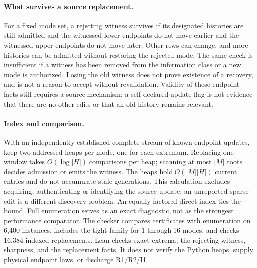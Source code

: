 \documentclass[11pt]{article}
\begin{document}
\paragraph{What survives a source replacement.}
For a fixed mode set, a rejecting witness survives if its designated
histories are still admitted and the witnessed lower endpoints
do not move earlier and the witnessed upper endpoints do not move
later. Other rows can change, and more histories can be admitted
without restoring the rejected mode. The same check is insufficient
if a witness has been removed from the information class or a new
mode is authorized. Losing the old witness does not prove existence
of a recovery, and is not a reason to accept without revalidation.
Validity of these endpoint facts still requires a source mechanism;
a self-declared update flag is not evidence that there are no
other edits or that an old history remains relevant.

\paragraph{Index and comparison.}
With an independently established complete stream of known endpoint
updates, keep two addressed heaps per mode, one for each extremum.
Replacing one window takes \(O(\log|H|)\) comparisons per heap;
scanning at most \(|M|\) roots decides admission or emits the witness.
The heaps hold \(O(|M||H|)\) current entries and do not accumulate
stale generations. This calculation excludes acquiring, authenticating
or identifying the source update; an unreported sparse edit is a
different discovery problem. An equally factored direct index ties
the bound. Full enumeration serves as an exact diagnostic, not as
the strongest performance comparator.
The checker compares certificates with enumeration on 6,400
instances, includes the tight family for 1 through 16 modes,
and checks 16,384 indexed replacements.
Lean checks exact extrema, the rejecting witness, sharpness,
and the replacement facts. It does not verify the Python heaps,
supply physical endpoint laws, or discharge R1/R2/I1.
\end{document}
